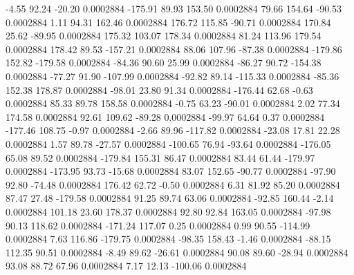        -4.55       92.24      -20.20     0.0002884
     -175.91       89.93      153.50     0.0002884
       79.66      154.64      -90.53     0.0002884
        1.11       94.31      162.46     0.0002884
      176.72      115.85      -90.71     0.0002884
      170.84       25.62      -89.95     0.0002884
      175.32      103.07      178.34     0.0002884
       81.24      113.96      179.54     0.0002884
      178.42       89.53     -157.21     0.0002884
       88.06      107.96      -87.38     0.0002884
     -179.86      152.82     -179.58     0.0002884
      -84.36       90.60       25.99     0.0002884
      -86.27       90.72     -154.38     0.0002884
      -77.27       91.90     -107.99     0.0002884
      -92.82       89.14     -115.33     0.0002884
      -85.36      152.38      178.87     0.0002884
      -98.01       23.80       91.34     0.0002884
     -176.44       62.68       -0.63     0.0002884
       85.33       89.78      158.58     0.0002884
       -0.75       63.23      -90.01     0.0002884
        2.02       77.34      174.58     0.0002884
       92.61      109.62      -89.28     0.0002884
      -99.97       64.64        0.37     0.0002884
     -177.46      108.75       -0.97     0.0002884
       -2.66       89.96     -117.82     0.0002884
      -23.08       17.81       22.28     0.0002884
        1.57       89.78      -27.57     0.0002884
     -100.65       76.94      -93.64     0.0002884
     -176.05       65.08       89.52     0.0002884
     -179.84      155.31       86.47     0.0002884
       83.44       61.44     -179.97     0.0002884
     -173.95       93.73      -15.68     0.0002884
       83.07      152.65      -90.77     0.0002884
      -97.90       92.80      -74.48     0.0002884
      176.42       62.72       -0.50     0.0002884
        6.31       81.92       85.20     0.0002884
       87.47       27.48     -179.58     0.0002884
       91.25       89.74       63.06     0.0002884
      -92.85      160.44       -2.14     0.0002884
      101.18       23.60      178.37     0.0002884
       92.80       92.84      163.05     0.0002884
      -97.98       90.13      118.62     0.0002884
     -171.24      117.07        0.25     0.0002884
        0.99       90.55     -114.99     0.0002884
        7.63      116.86     -179.75     0.0002884
      -98.35      158.43       -1.46     0.0002884
      -88.15      112.35       90.51     0.0002884
       -8.49       89.62      -26.61     0.0002884
       90.08       89.60      -28.94     0.0002884
       93.08       88.72       67.96     0.0002884
        7.17       12.13     -100.06     0.0002884
